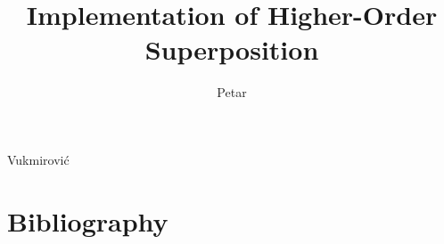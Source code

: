 \documentclass{dissertation}
\begin{document}


\title{Implementation of Higher-Order Superposition}
\author{Petar}{Vukmirović}

\frontmatter




\tableofcontents




\mainmatter

\thumbtrue












%

\thumbfalse

\chapter*{Bibliography}







% 
\end{document}
